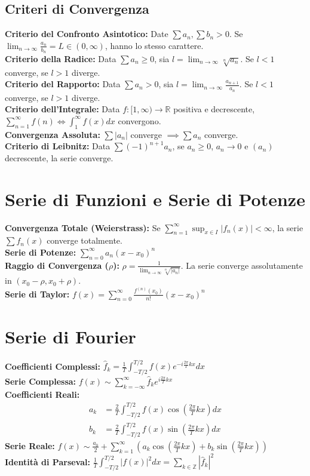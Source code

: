 \documentclass[12pt, a4paper]{article}
\begin{document}
\subsection{Criteri di Convergenza}
\textbf{Criterio del Confronto Asintotico:} Date $\sum a_n, \sum b_n > 0$. Se $\lim_{n \to \infty} \frac{a_n}{b_n} = L \in (0, \infty)$, hanno lo stesso carattere.  \\
\textbf{Criterio della Radice:} Data $\sum a_n \geq 0$, sia $l = \lim_{n \to \infty} \sqrt[n]{a_n}$. Se $l<1$ converge, se $l>1$ diverge.  \\
\textbf{Criterio del Rapporto:} Data $\sum a_n > 0$, sia $l = \lim_{n \to \infty} \frac{a_{n+1}}{a_n}$. Se $l<1$ converge, se $l>1$ diverge.  \\
\textbf{Criterio dell'Integrale:} Data $f:[1, \infty) \to \mathbb{R}$ positiva e decrescente, $\sum_{n=1}^{\infty} f(n) \iff \int_1^\infty f(x) dx$ convergono.  \\
\textbf{Convergenza Assoluta:} $\sum |a_n|$ converge $\implies \sum a_n$ converge.  \\
\textbf{Criterio di Leibnitz:} Data $\sum (-1)^{n+1} a_n$, se $a_n \geq 0$, $a_n \to 0$ e $(a_n)$ decrescente, la serie converge. 

\section{Serie di Funzioni e Serie di Potenze}

\textbf{Convergenza Totale (Weierstrass):} Se $\sum_{n=1}^{\infty} \sup_{x \in I} |f_n(x)| < \infty$, la serie $\sum f_n(x)$ converge totalmente.  \\
\textbf{Serie di Potenze:} $\sum_{n=0}^{\infty} a_n (x-x_0)^n$  \\
\textbf{Raggio di Convergenza ($\rho$):} $\rho = \frac{1}{\lim_{n \to \infty} \sqrt[n]{|a_n|}}$.  La serie converge assolutamente in $(x_0 - \rho, x_0 + \rho)$.  \\
\textbf{Serie di Taylor:} $f(x) = \sum_{n=0}^{\infty} \frac{f^{(n)}(x_0)}{n!}(x-x_0)^n$ 

\section{Serie di Fourier}
\textbf{Coefficienti Complessi:} $\hat{f}_k = \frac{1}{T}\int_{-T/2}^{T/2} f(x) e^{-i\frac{2\pi}{T}kx} dx$  \\
\textbf{Serie Complessa:} $f(x) \sim \sum_{k=-\infty}^{\infty} \hat{f}_k e^{i\frac{2\pi}{T}kx}$  \\
\textbf{Coefficienti Reali:}
\begin{align*}
a_k &= \frac{2}{T}\int_{-T/2}^{T/2} f(x) \cos\left(\frac{2\pi}{T}kx\right) dx \\
b_k &= \frac{2}{T}\int_{-T/2}^{T/2} f(x) \sin\left(\frac{2\pi}{T}kx\right) dx
\end{align*}
\textbf{Serie Reale:} $f(x) \sim \frac{a_0}{2} + \sum_{k=1}^{\infty} \left( a_k \cos\left(\frac{2\pi}{T}kx\right) + b_k \sin\left(\frac{2\pi}{T}kx\right) \right)$  \\
\textbf{Identità di Parseval:} $\frac{1}{T}\int_{-T/2}^{T/2} |f(x)|^2 dx = \sum_{k \in \mathbb{Z}} |\hat{f}_k|^2$ 
\end{document}
